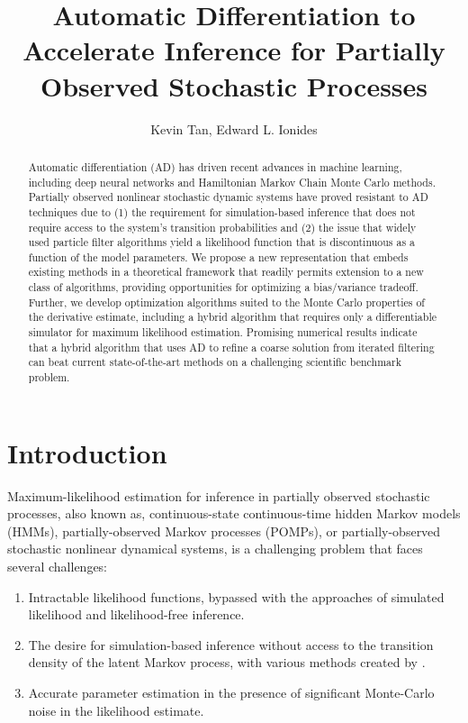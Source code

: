 \documentclass{article}
\title{Automatic Differentiation to Accelerate Inference for Partially Observed Stochastic Processes}
\author{Kevin Tan, Edward L. Ionides}
\date{}
\begin{document}
\maketitle
\begin{abstract}
    
Automatic differentiation (AD) has driven recent advances in machine learning, including deep neural networks and Hamiltonian Markov Chain Monte Carlo methods. Partially observed nonlinear stochastic dynamic systems have proved resistant to AD techniques due to (1) the requirement for simulation-based inference that does not require access to the system's transition probabilities and (2) the issue that widely used particle filter algorithms yield a likelihood function that is discontinuous as a function of the model parameters. We propose a new representation that embeds existing methods in a theoretical framework that readily permits extension to a new class of algorithms, providing opportunities for optimizing a bias/variance tradeoff. Further, we develop optimization algorithms suited to the Monte Carlo properties of the derivative estimate, including a hybrid algorithm that requires only a differentiable simulator for maximum likelihood estimation. Promising numerical results indicate that a hybrid algorithm that uses AD to refine a coarse solution from iterated filtering can beat current state-of-the-art methods on a challenging scientific benchmark problem.
\end{abstract}

\section{Introduction}

Maximum-likelihood estimation for inference in partially observed stochastic processes, also known as, continuous-state continuous-time hidden Markov models (HMMs), partially-observed Markov processes (POMPs), or partially-observed stochastic nonlinear dynamical systems, is a challenging problem that faces several challenges: 
\begin{enumerate}
    \item Intractable likelihood functions, bypassed with the approaches of simulated likelihood and likelihood-free inference. 
    \item The desire for simulation-based inference without access to the transition density of the latent Markov process, with various methods created by \cite{welch2009abc, wood2010sl, doucet2010pmcmc, Ionides_infdynsys, Ionides_infpomp}. 
    \item Accurate parameter estimation in the presence of significant Monte-Carlo noise in the likelihood estimate.
\end{enumerate}
\end{document}
